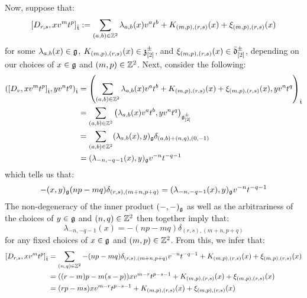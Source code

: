 \begin{remark}
\begin{itemize}
                    Now, suppose that:
                        $$[D_{r, s}, x v^m t^p]_{\hat{\mathfrak{t}}} := \sum_{(a, b) \in \mathbb{Z}^2} \lambda_{a, b}(x) v^a t^b + K_{(m, p), (r, s)}(x) + \xi_{(m, p), (r, s)}(x)$$
                    for some $\lambda_{a, b}(x) \in \mathfrak{g}$, $K_{(m, p), (r, s)}(x) \in \mathfrak{z}_{[2]}^{\pm}$, and $\xi_{(m, p), (r, s)}(x) \in \bar{\mathfrak{d}}_{[2]}^{\pm}$, depending on our choices of $x \in \mathfrak{g}$ and $(m, p) \in \mathbb{Z}^2$. Next, consider the following:
                        $$
                            \begin{aligned}
                                ( [D_v, x v^m t^p]_{\hat{\mathfrak{t}}}, y v^n t^q )_{\hat{\mathfrak{t}}} & = \left( \sum_{(a, b) \in \mathbb{Z}^2} \lambda_{a, b}(x) v^a t^b + K_{(m, p), (r, s)}(x) + \xi_{(m, p), (r, s)}(x), y v^n t^q \right)_{\hat{\mathfrak{t}}}
                                \\
                                & = \sum_{(a, b) \in \mathbb{Z}^2} \left( \lambda_{a, b}(x) v^a t^b, y v^n t^q \right)_{\mathfrak{g}_{[2]}^{\pm}}
                                \\
                                & = \sum_{(a, b) \in \mathbb{Z}^2} (\lambda_{a, b}(x), y)_{\mathfrak{g}} \delta_{ (a, b) + (n, q), (0, -1) }
                                \\
                                & = (\lambda_{-n, -q - 1}(x), y)_{\mathfrak{g}} v^{-n} t^{-q - 1}
                            \end{aligned}
                        $$
                    which tells us that:
                        $$-(x, y)_{\mathfrak{g}} (np - mq) \delta_{(r, s), (m + n, p + q)} = (\lambda_{-n, -q - 1}(x), y)_{\mathfrak{g}} v^{-n} t^{-q - 1}$$
                    The non-degeneracy of the inner product $(-, -)_{\mathfrak{g}}$ as well as the arbitrariness of the choices of $y \in \mathfrak{g}$ and $(n, q) \in \mathbb{Z}^2$ then together imply that:
                        $$\lambda_{-n, -q - 1}(x) = -(np - mq) \delta_{(r, s), (m + n, p + q)}$$
                    for any fixed choices of $x \in \mathfrak{g}$ and $(m, p) \in \mathbb{Z}^2$. From this, we infer that:
                        $$
                            \begin{aligned}
                                [D_{r, s}, x v^m t^p]_{\hat{\t}} & = \sum_{(n, q) \in \Z^2} -(np - mq) \delta_{(r, s), (m + n, p + q)} v^{-n} t^{-q - 1} + K_{(m, p), (r, s)}(x) + \xi_{(m, p), (r, s)}(x)
                                \\
                                & = ( (r - m)p - m(s - p) ) x v^{m - r} t^{p - s - 1} + K_{(m, p), (r, s)}(x) + \xi_{(m, p), (r, s)}(x)
                                \\
                                & = ( rp - ms ) x v^{m - r} t^{p - s - 1} + K_{(m, p), (r, s)}(x) + \xi_{(m, p), (r, s)}(x)
                            \end{aligned}
                        $$
                        

\end{itemize}
\end{remark}
